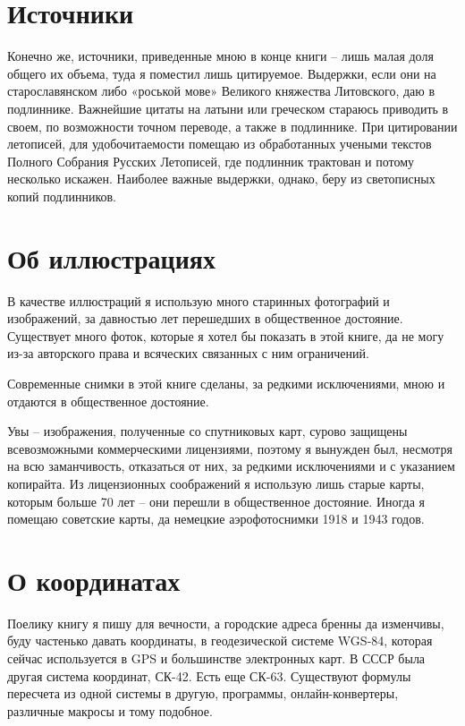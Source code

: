 \section*{Источники} 

Конечно же, источники, приведенные мною в конце книги – лишь малая доля общего их объема, туда я поместил лишь цитируемое. Выдержки, если они на старославянском либо «роськой мове» Великого княжества Литовского, даю в подлиннике. Важнейшие цитаты на латыни или греческом стараюсь приводить в своем, по возможности точном переводе, а также в подлиннике. При цитировании летописей, для удобочитаемости помещаю из обработанных учеными текстов Полного Собрания Русских Летописей, где подлинник трактован и потому несколько искажен. Наиболее важные выдержки, однако, беру из светописных копий подлинников.

\section*{Об иллюстрациях} 

В качестве иллюстраций я использую много старинных фотографий и изображений, за давностью лет перешедших в общественное достояние. Существует много фоток, которые я хотел бы показать в этой книге, да не могу из-за авторского права и всяческих связанных с ним ограничений.

Современные снимки в этой книге сделаны, за редкими исключениями, мною и отдаются в общественное достояние.

Увы – изображения, полученные со спутниковых карт, сурово защищены всевозможными коммерческими лицензиями, поэтому я вынужден был, несмотря на всю заманчивость, отказаться от них, за редкими исключениями и с указанием копирайта. Из лицензионных соображений я использую лишь старые карты, которым больше 70 лет – они перешли в общественное достояние. Иногда я помещаю советские карты, да немецкие аэрофотоснимки 1918 и 1943 годов.

\section*{О координатах}

Поелику книгу я пишу для вечности, а городские адреса бренны да изменчивы, буду частенько давать координаты, в геодезической системе WGS-84, которая сейчас используется в GPS и большинстве электронных карт. В СССР была другая система координат, СК-42. Есть еще СК-63. Существуют формулы пересчета из одной системы в другую, программы, онлайн-конвертеры, различные макросы и тому подобное. 

